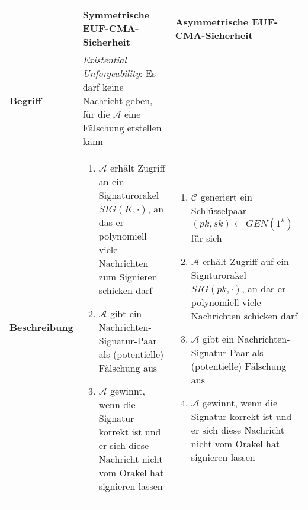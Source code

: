 \begin{landscape}
\begin{table}[H]
\begin{tabularx}{\linewidth}{|l|X|X|}
\hline
& \textbf{Symmetrische EUF-CMA-Sicherheit} & \textbf{Asymmetrische EUF-CMA-Sicherheit} \\
\hline
\textbf{Begriff} &
\textit{Existential Unforgeability}: Es darf keine Nachricht geben, für die \(\mathcal{A}\) eine Fälschung erstellen kann &
\\
\hline
\textbf{Beschreibung} &
\begin{enumerate}
	\item \(\mathcal{A}\) erhält Zugriff an ein Signaturorakel \(SIG(K,\cdot)\), an das er polynomiell viele Nachrichten zum Signieren schicken darf
	\item \(\mathcal{A}\) gibt ein Nachrichten-Signatur-Paar als (potentielle) Fälschung aus
	\item \(\mathcal{A}\) gewinnt, wenn die Signatur korrekt ist und er sich diese Nachricht nicht vom Orakel hat signieren lassen
\end{enumerate} &
\begin{enumerate}
	\item \(\mathcal{C}\) generiert ein Schlüsselpaar \((pk,sk) \leftarrow GEN(1^k)\) für sich
	\item \(\mathcal{A}\) erhält Zugriff auf ein Signturorakel \(SIG(pk,\cdot)\), an das er polynomiell viele Nachrichten schicken darf
	\item \(\mathcal{A}\) gibt ein Nachrichten-Signatur-Paar als (potentielle) Fälschung aus
	\item \(\mathcal{A}\) gewinnt, wenn die Signatur korrekt ist und er sich diese Nachricht nicht vom Orakel hat signieren lassen
\end{enumerate}
\\
\hline
\end{tabularx}
\end{table}

\end{landscape}
